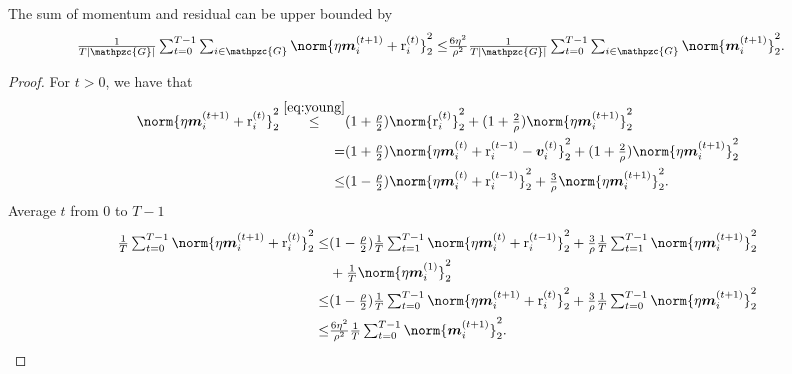 \documentclass{article}
\newcommand{\gset}{\ensuremath{{\mathpzc{G}}}}
\begin{document}
\begin{lemma}
  \label{lemma:etam_r}
  The sum of momentum and residual can be upper bounded by
  \begin{align*}
    \tfrac{1}{T|\gset|} \tsum_{t=0}^{T-1} \tsum_{i\in\gset} \norm{\eta\mm_i^{(t+1)} +\rr_i^{(t)} }_2^2
    \le & \tfrac{6\eta^2}{\rho^2} \tfrac{1}{T|\gset|}  \tsum_{t=0}^{T-1} \tsum_{i\in\gset}\norm{\mm_i^{(t+1)} }_2^2.
  \end{align*}
\end{lemma}
\begin{proof}
  For $t>0$, we have that
  \begin{align*}
    \norm{\eta\mm_i^{(t+1)} +\rr_i^{(t)} }_2^2
    \stackrel{\eqref{eq:young}}{\le} &
    (1+\tfrac{\rho}{2})\norm{\rr_i^{(t)} }_2^2
    +(1+\tfrac{2}{\rho})\norm{\eta\mm_i^{(t+1)} }_2^2                                                               \\
    =                                & (1+\tfrac{\rho}{2})\norm{\eta\mm_i^{(t)} + \rr_i^{(t-1)} - \vv_i^{(t)} }_2^2
    +(1+\tfrac{2}{\rho})\norm{\eta\mm_i^{(t+1)} }_2^2                                                               \\
    \le                              & (1-\tfrac{\rho}{2})\norm{\eta\mm_i^{(t)} + \rr_i^{(t-1)} }_2^2
    +\tfrac{3}{\rho}\norm{\eta\mm_i^{(t+1)} }_2^2.
  \end{align*}
  Average $t$ from 0 to $T-1$
  \begin{align*}
    \tfrac{1}{T} \tsum_{t=0}^{T-1} \norm{\eta\mm_i^{(t+1)} +\rr_i^{(t)} }_2^2
    \le & (1-\tfrac{\rho}{2}) \tfrac{1}{T} \tsum_{t=1}^{T-1} \norm{\eta\mm_i^{(t)} +\rr_i^{(t-1)} }_2^2
    + \tfrac{3}{\rho} \tfrac{1}{T} \tsum_{t=1}^{T-1}\norm{\eta\mm_i^{(t+1)} }_2^2                       \\
        & + \tfrac{1}{T} \norm{\eta\mm_i^{(1)}}_2^2                                                     \\
    \le & (1-\tfrac{\rho}{2}) \tfrac{1}{T} \tsum_{t=0}^{T-1} \norm{\eta\mm_i^{(t+1)} +\rr_i^{(t)} }_2^2
    + \tfrac{3}{\rho} \tfrac{1}{T} \tsum_{t=0}^{T-1}\norm{\eta\mm_i^{(t+1)} }_2^2                       \\
    \le & \tfrac{6\eta^2}{\rho^2} \tfrac{1}{T} \tsum_{t=0}^{T-1}\norm{\mm_i^{(t+1)} }_2^2.
  \end{align*}
\end{proof}
\end{document}
